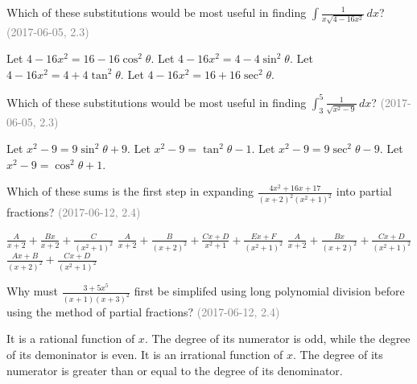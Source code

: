 \documentclass[12pt]{exam}
\newcommand{\questionDate}[1]{\textcolor{gray}{(#1)}}
\newcommand{\<}{\langle}
\renewcommand{\>}{\rangle}
\begin{document}
\begin{questions}
  \question
  Which of these substitutions would be most useful in finding
  \(\int\frac{1}{x\sqrt{4-16x^2}}\,dx\)?
  \questionDate{2017-06-05, 2.3}
  \begin{choices}
    \choice Let \(4-16x^2=16-16\cos^2\theta\).
    \CorrectChoice Let \(4-16x^2=4-4\sin^2\theta\).
    \choice Let \(4-16x^2=4+4\tan^2\theta\).
    \choice Let \(4-16x^2=16+16\sec^2\theta\).
  \end{choices}

  \question
  Which of these substitutions would be most useful in finding
  \(\int_3^5\frac{1}{\sqrt{x^2-9}}\,dx\)?
  \questionDate{2017-06-05, 2.3}
  \begin{choices}
    \choice Let \(x^2-9=9\sin^2\theta+9\).
    \choice Let \(x^2-9=\tan^2\theta-1\).
    \CorrectChoice Let \(x^2-9=9\sec^2\theta-9\).
    \choice Let \(x^2-9=\cos^2\theta+1\).
  \end{choices}
























  \newpage

  \question
  Which of these sums is the first step in expanding
  \(\frac{4x^2+16x+17}{(x+2)^2(x^2+1)^2}\) into partial fractions?
  \questionDate{2017-06-12, 2.4}
  \begin{choices}
    \choice \(\frac{A}{x+2}+\frac{Bx}{x+2}+\frac{C}{(x^2+1)^2}\)
    \CorrectChoice \(\frac{A}{x+2}+\frac{B}{(x+2)^2}+
      \frac{Cx+D}{x^2+1}+\frac{Ex+F}{(x^2+1)^2}\)
    \choice \(\frac{A}{x+2}+\frac{Bx}{(x+2)^2}+\frac{Cx+D}{(x^2+1)^2}\)
    \choice \(\frac{Ax+B}{(x+2)^2}+\frac{Cx+D}{(x^2+1)^2}\)
  \end{choices}

  \question
  Why must \(\frac{3+5x^5}{(x+1)(x+3)^2}\) first be simplifed using
  long polynomial division before using the method of partial fractions?
  \questionDate{2017-06-12, 2.4}
  \begin{choices}
    \choice It is a rational function of \(x\).
    \choice The degree of its numerator is odd, while the degree of its
      demoninator is even.
    \choice It is an irrational function of \(x\).
    \CorrectChoice The degree of its numerator is greater than or equal to
      the degree of its denominator.
  \end{choices}




\end{questions}
\end{document}
